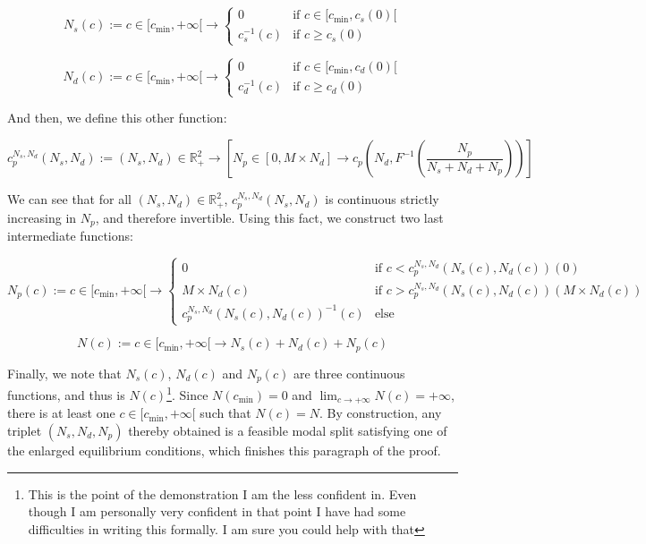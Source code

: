\documentclass[english, a4paper]{article}
\theoremstyle{plain}
\theoremstyle{definition}
\theoremstyle{remark}
\begin{document}
\begin{equation*}
    N_s(c):= c\in [c_{\text{min}}, +\infty[ \longrightarrow \left\{
    \begin{array}{lr}
        0 & \text{if } c \in [c_{\text{min}}, c_s(0)[\\
        c_s^{-1}(c) & \text{if } c \geq c_s(0)
    \end{array}
    \right.
\end{equation*}

\begin{equation*}
    N_d(c):= c\in [c_{\text{min}}, +\infty[ \longrightarrow \left\{
    \begin{array}{lr}
        0 & \text{if } c \in [c_{\text{min}}, c_d(0)[\\
        c_d^{-1}(c) & \text{if } c \geq c_d(0)
    \end{array}
    \right.
\end{equation*}

And then, we define this other function:

\begin{equation*}
    c_p^{N_s, N_d}(N_s, N_d):= (N_s, N_d) \in \mathbb{R} _{+}^2 \longrightarrow \left[ N_p \in [0, M\times N_d] \longrightarrow c_p\left( N_d, F^{-1}\left(\frac{N_p}{N_s + N_d + N_p} \right) \right) \right]
\end{equation*}

We can see that for all $(N_s, N_d) \in \mathbb{R} _{+}^2$, $c_p^{N_s, N_d}(N_s, N_d)$ is continuous strictly increasing in $N_p$, and therefore invertible. Using this fact, we construct two last intermediate functions:

\begin{equation*}
    N_p(c):= c\in [c_{\text{min}}, +\infty[ \longrightarrow
    \left\{
    \begin{array}{lr}
        0 & \text{if } c < c_p^{N_s, N_d} (N_s(c), N_d(c))(0)\\
        M\times N_d(c) & \text{if } c > c_p^{N_s, N_d} (N_s(c), N_d(c))(M\times N_d(c))\\
        c_p^{N_s, N_d} (N_s(c), N_d(c)) ^{-1} (c) & \text{else}
    \end{array}
    \right.
\end{equation*}

\begin{equation*}
    N(c):= c\in [c_{\text{min}}, +\infty[ \longrightarrow N_s(c) + N_d(c) + N_p(c)
\end{equation*}

Finally, we note that $N_s(c)$, $N_d(c)$ and $N_p(c)$ are three continuous functions, and thus is $N(c)$\footnote{This is the point of the demonstration I am the less confident in. Even though I am personally very confident in that point I have had some difficulties in writing this formally. I am sure you could help with that}. Since $N(c_{\text{min}}) = 0$ and $\lim_{c\rightarrow +\infty} N(c) = +\infty$, there is at least one $c\in [c_{\text{min}}, +\infty[$ such that $N(c) = N$. By construction, any triplet $(N_s, N_d, N_p)$ thereby obtained is a feasible modal split satisfying one of the enlarged equilibrium conditions, which finishes this paragraph of the proof.
\end{document}
